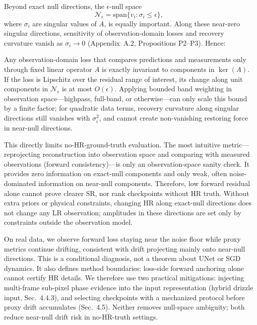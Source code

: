 Beyond exact null directions, the $\epsilon$-null space
\[
\mathcal{N}_{\epsilon}=\mathrm{span}\{v_i:\sigma_i\le\epsilon\},
\]
where $\sigma_i$ are singular values of $A$, is equally important. Along these near-zero singular directions, sensitivity of observation-domain losses and recovery curvature vanish as $\sigma_i\to 0$ (Appendix~A.2, Propositions P2--P3). Hence:

Any observation-domain loss that compares predictions and measurements only through fixed linear operator $A$ is exactly invariant to components in $\ker(A)$. If the loss is Lipschitz over the residual range of interest, its change along unit components in $\mathcal{N}_{\epsilon}$ is at most $O(\epsilon)$. Applying bounded band weighting in observation space---highpass, full-band, or otherwise---can only scale this bound by a finite factor; for quadratic data terms, recovery curvature along singular directions still vanishes with $\sigma_i^2$, and cannot create non-vanishing restoring force in near-null directions.

This directly limits no-HR-ground-truth evaluation. The most intuitive metric---reprojecting reconstruction into observation space and comparing with measured observations (forward consistency)---is only an observation-space sanity check. It provides zero information on exact-null components and only weak, often noise-dominated information on near-null components. Therefore, low forward residual alone cannot prove clearer SR, nor rank checkpoints without HR truth. Without extra priors or physical constraints, changing HR along exact-null directions does not change any LR observation; amplitudes in these directions are set only by constraints outside the observation model.

On real data, we observe forward loss staying near the noise floor while proxy metrics continue drifting, consistent with drift projecting mainly onto near-null directions. This is a conditional diagnosis, not a theorem about UNet or SGD dynamics. It also defines method boundaries: loss-side forward anchoring alone cannot certify HR details. We therefore use two practical mitigations: injecting multi-frame sub-pixel phase evidence into the input representation (hybrid drizzle input, Sec.~4.4.3), and selecting checkpoints with a mechanized protocol before proxy drift accumulates (Sec.~4.5). Neither removes null-space ambiguity; both reduce near-null drift risk in no-HR-truth settings.

